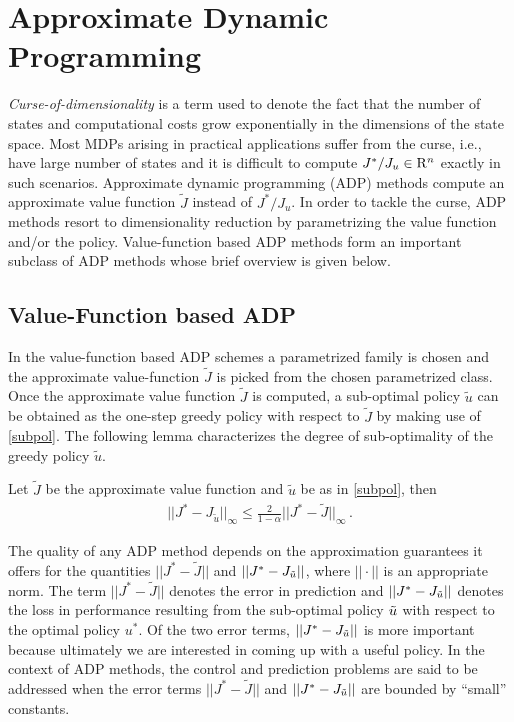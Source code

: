 \section{Approximate Dynamic Programming}
\emph{Curse-of-dimensionality} is a term used to denote the fact that the number of states and computational costs grow exponentially in the dimensions of the state space. 
Most MDPs arising in practical applications suffer from the curse, i.e., have large number of states and it is difficult to compute $J^*/J_u\in \mathrm{R}^n$ exactly in such scenarios. Approximate dynamic programming (ADP) \cite{lspi,lspe,ALP,wang2014approximate} methods compute an approximate value function $\tilde{J}$ instead of $J^*/J_u$. In order to tackle the curse, ADP methods resort to dimensionality reduction by parametrizing the value function and/or the policy. Value-function based ADP methods form an important subclass of ADP methods whose brief overview is given below.

\subsection{Value-Function based ADP}
In the value-function based ADP schemes a parametrized family is chosen and the approximate value-function $\tilde{J}$ is picked from the chosen parametrized class.
Once the approximate value function $\tilde{J}$ is computed, a sub-optimal policy $\tilde{u}$ can be obtained as the one-step greedy policy with respect to $\tilde{J}$ by making use of \eqref{subpol}.
The following lemma characterizes the degree of sub-optimality of the greedy policy $\tilde{u}$.
\begin{lemma}\label{subopt}
Let $\tilde{J}$ be the approximate value function and $\tilde{u}$ be as in \eqref{subpol}, then 
\begin{align}
||J^*-J_{\tilde{u}}||_\infty \leq \frac{2}{1-\alpha}||J^*-\tilde{J}||_\infty\,.
\end{align}
\end{lemma}
The quality of any ADP method depends on the approximation guarantees it offers for the quantities $||J^*-\tilde{J}||$ and $||J^*-J_{\tilde{u}}||$, where $||\cdot||$ is an appropriate norm. The term  $||J^*-\tilde{J}||$ denotes the error in prediction and $||J^*-J_{\tilde{u}}||$ denotes the loss in performance resulting from the sub-optimal policy $\tilde{u}$ with respect to the optimal policy $u^*$. Of the two error terms, $||J^*-J_{\tilde{u}}||$ is more important because ultimately we are interested in coming up with a useful policy. In the context of ADP methods, the control and prediction problems are said to be addressed when the error terms $||J^*-\tilde{J}||$ and $||J^*-J_{\tilde{u}}||$ are bounded by ``small'' constants.

